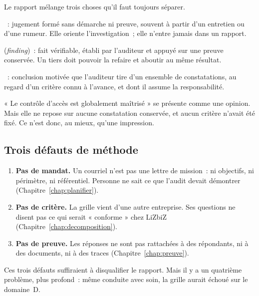 Le rapport mélange trois choses qu'il faut toujours séparer.

\begin{boxdef}
~: jugement formé sans démarche ni
preuve, souvent à partir d'un entretien ou d'une rumeur. Elle oriente
l'investigation~; elle n'entre jamais dans un rapport.

\medskip
{} (\textit{finding})~: fait
vérifiable, établi par l'auditeur et appuyé sur une preuve conservée. Un
tiers doit pouvoir la refaire et aboutir au même résultat.

\medskip
{}~: conclusion motivée que
l'auditeur tire d'un ensemble de constatations, au regard d'un critère
connu à l'avance, et dont il assume la responsabilité.
\end{boxdef}

« Le contrôle d'accès est globalement maîtrisé » se présente comme une
opinion. Mais elle ne repose sur aucune constatation conservée, et aucun
critère n'avait été fixé. Ce n'est donc, au mieux, qu'une impression.

\subsection{Trois défauts de méthode}

\begin{enumerate}
    \item \textbf{Pas de mandat.} Un courriel n'est pas une lettre de
          mission~: ni objectifs, ni périmètre, ni référentiel. Personne ne
          sait ce que l'audit devait démontrer (Chapitre~\ref{chap:planifier}).
    \item \textbf{Pas de critère.} La grille vient d'une autre entreprise.
          Ses questions ne disent pas ce qui serait « conforme » chez
          LiZbiZ (Chapitre~\ref{chap:decomposition}).
    \item \textbf{Pas de preuve.} Les réponses ne sont pas rattachées à des
          répondants, ni à des documents, ni à des traces
          (Chapitre~\ref{chap:preuve}).
\end{enumerate}

Ces trois défauts suffiraient à disqualifier le rapport. Mais il y a un
quatrième problème, plus profond~: même conduite avec soin, la grille aurait
échoué sur le domaine~D.

